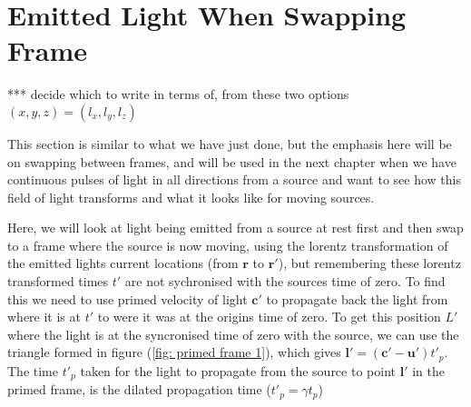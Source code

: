 \section{Emitted Light When Swapping Frame}\label{subsect: Emitted Light When Swapping Frame}

*** decide which to write in terms of, from these two options $(x,y,z)=(l_x,l_y,l_z)$

This section is similar to what we have just done, but the emphasis here will be on swapping between frames, and will be used in the next chapter when we have continuous pulses of light in all directions from a source and want to see how this field of light transforms and what it looks like for moving sources.

Here, we will look at light being emitted from a source at rest first and then swap to a frame where the source is now moving, using the lorentz transformation of the emitted lights current locations (from $\mathbf{r}$ to $\mathbf{r}{'}$), but remembering these lorentz transformed times $t'$ are not sychronised with the sources time of zero.
To find this we need to use primed velocity of light $\mathbf{c}{'}$ to propagate back the light from where it is at $t'$ to were it was at the origins time of zero.
To get this position $L'$ where the light is at the syncronised time of zero with the source, we can use the triangle formed in figure (\ref{fig: primed frame 1}), which gives $\mathbf{l}' = (\mathbf{c}' - \mathbf{u'}) t'_p$.
The time $t'_p$ taken for the light to propagate from the source to point $\mathbf{l}'$ in the primed frame, is the dilated propagation time ($t'_p = \gamma t_p$)

